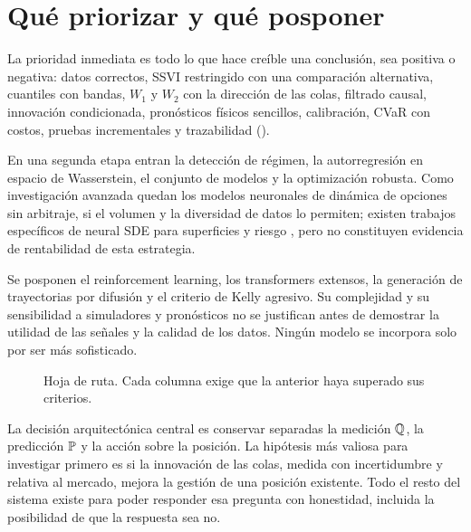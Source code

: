 \clearpage
\section{Qué priorizar y qué posponer}\label{sec:prioridades}

La prioridad inmediata es todo lo que hace creíble una conclusión, sea positiva o negativa: datos
correctos, SSVI restringido con una comparación alternativa, cuantiles con bandas, $W_1$ y $W_2$ con la
dirección de las colas, filtrado causal, innovación condicionada, pronósticos físicos sencillos,
calibración, CVaR con costos, pruebas incrementales y trazabilidad ().

En una segunda etapa entran la detección de régimen, la autorregresión en espacio de Wasserstein, el
conjunto de modelos y la optimización robusta. Como investigación avanzada quedan los modelos neuronales de
dinámica de opciones sin arbitraje, si el volumen y la diversidad de datos lo permiten; existen trabajos
específicos de neural SDE para superficies y riesgo \citep{cohen2021}, pero no constituyen evidencia de
rentabilidad de esta estrategia.

Se posponen el reinforcement learning, los transformers extensos, la generación de trayectorias por
difusión y el criterio de Kelly agresivo. Su complejidad y su sensibilidad a simuladores y pronósticos no se
justifican antes de demostrar la utilidad de las señales y la calidad de los datos. Ningún modelo se
incorpora solo por ser más sofisticado.

\begin{figure}[H]
\centering
\resizebox{0.94\linewidth}{!}{}
\caption{Hoja de ruta. Cada columna exige que la anterior haya superado sus criterios.}
\label{fig:prioridades}
\end{figure}

\begin{ideaclavefinal}[En resumen]
La decisión arquitectónica central es conservar separadas la medición $\Q$, la predicción $\P$ y la acción
sobre la posición. La hipótesis más valiosa para investigar primero es si la innovación de las colas,
medida con incertidumbre y relativa al mercado, mejora la gestión de una posición existente. Todo el resto
del sistema existe para poder responder esa pregunta con honestidad, incluida la posibilidad de que la
respuesta sea no.
\end{ideaclavefinal}
